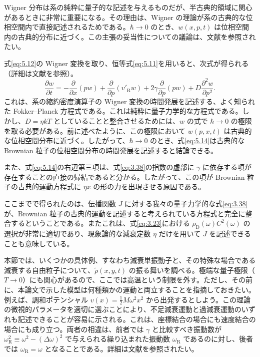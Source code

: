 Wigner 分布は系の純粋に量子的な記述を与えるものだが、半古典的領域に関心があるときに非常に重要になる。その理由は、Wigner の理論が系の古典的な位相空間内で直接記述されるためである。$\hbar\to0$ のとき、$w(x,p,t)$ は位相空間内の古典的分布に近づく。この主張の妥当性についての議論は、文献\cite{ref03,ref30}を参照されたい。

式\eqref{eq:5.12}の Wigner 変換を取り、恒等式\eqref{eq:5.11}を用いると、次式が得られる（詳細は文献\cite{ref07}を参照）。
\begin{equation}
\frac{\partial w}{\partial t}
=-\frac{\partial}{\partial x}(pw)
+\frac{\partial}{\partial p}(v'_{\mathrm R}w)
+2\gamma\frac{\partial}{\partial p}(pw)
+D\frac{\partial^2w}{\partial p^2}.
\tag{5.14}\label{eq:5.14}
\end{equation}
これは、系の縮約密度演算子の Wigner 変換の時間発展を記述する、よく知られた Fokker--Planck 方程式である。これは純粋に量子力学的な方程式である。しかし、$D=\eta kT$ としていることと整合させるためには、$w$ の式で $\hbar\to0$ の極限を取る必要がある。前に述べたように、この極限において $w(p,x,t)$ は古典的な位相空間分布に近づく。したがって、$\hbar\to0$ のとき、式\eqref{eq:5.14}は古典的な Brownian 粒子の位相空間分布の時間発展を記述すると結論できる。

また、式\eqref{eq:5.14}の右辺第三項は、式\eqref{eq:3.38}の指数の虚部に $\gamma$ に依存する項が存在することの直接の帰結であると分かる。したがって、この項が Brownian 粒子の古典的運動方程式に $\eta\dot x$ の形の力を出現させる原因である。

ここまでで得られたのは、伝播関数 $J$ に対する我々の量子力学的な式\eqref{eq:3.38}が、Brownian 粒子の古典的運動を記述すると考えられている方程式と完全に整合するということである。またこれは、式\eqref{eq:3.23}における $\rho_{\mathrm D}(\omega)C^2(\omega)$ の選択が非常に適切であり、現象論的な減衰定数 $\eta$ だけを用いて $J$ を記述できることも意味している。

\label{sec:6}
本節では、いくつかの具体例、すなわち減衰単振動子と、その特殊な場合である減衰する自由粒子について、$\tilde\rho(x,y,t)$ の振る舞いを調べる。極端な量子極限（$T\to0$）にも関心があるので、ここでは高温という制限を外す。ただし、その前に、本論文で示した模型は何種類かの運動と両立することを指摘しておきたい。例えば、調和ポテンシャル $v(x)=\frac12M\omega^2x^2$ から出発するとしよう。この理論の微視的パラメータを適切に選ぶことにより、不足減衰運動と過減衰運動のいずれも記述できることが容易に示される。これは、座標結合の場合にも速度結合の場合にも成り立つ。両者の相違は、前者では $\gamma$ と比較すべき振動数が $\omega_{\mathrm R}^2\equiv\omega^2-(\Delta\omega)^2$ で与えられる繰り込まれた振動数 $\omega_{\mathrm R}$ であるのに対し、後者では $\omega_{\mathrm R}=\omega$ となることである。詳細は文献\cite{ref31}を参照されたい。

